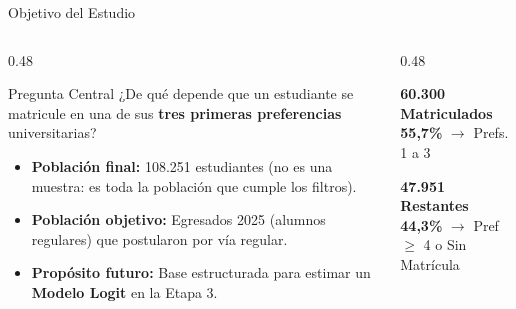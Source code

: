 \documentclass[10pt, aspectratio=169, xcolor=table]{beamer}
\begin{document}
\begin{frame}{Objetivo del Estudio}
  \begin{columns}[c]
    \begin{column}{0.48\textwidth}
      \begin{block}{Pregunta Central}
        ¿De qué depende que un estudiante se matricule en una de sus \textbf{\textcolor{USACHOrange}{tres primeras preferencias}} universitarias?
      \end{block}

      \vspace{0.3cm}

      \begin{itemize}
        \item \textbf{Población final:} 108.251 estudiantes (no es una muestra: es toda la población que cumple los filtros).
        \item \textbf{Población objetivo:} Egresados 2025 (alumnos regulares) que postularon por vía regular.
        \item \textbf{Propósito futuro:} Base estructurada para estimar un \textbf{Modelo Logit} en la Etapa 3.
      \end{itemize}
    \end{column}

    \begin{column}{0.48\textwidth}
      \centering
      \begin{tcolorbox}[colback=USACHCyan!12, colframe=USACHCyan!90!black, arc=3mm, halign=center, boxsep=3mm, left=2mm, right=2mm, top=3mm, bottom=3mm]
        {\Large \textbf{60.300 Matriculados}}\\[0.2cm]
        {\large \textbf{\textcolor{USACHCyan!90!black}{55,7\%}}} $\rightarrow$ Prefs. 1 a 3
      \end{tcolorbox}

      \vspace{0.4cm}

      \begin{tcolorbox}[colback=USACHOrange!12, colframe=USACHOrange!90!black, arc=3mm, halign=center, boxsep=3mm, left=2mm, right=2mm, top=3mm, bottom=3mm]
        {\Large \textbf{47.951 Restantes}}\\[0.2cm]
        {\large \textbf{\textcolor{USACHOrange!90!black}{44,3\%}}} $\rightarrow$ Pref $\ge$ 4 o Sin Matrícula
      \end{tcolorbox}
    \end{column}
  \end{columns}
\end{frame}
\end{document}
